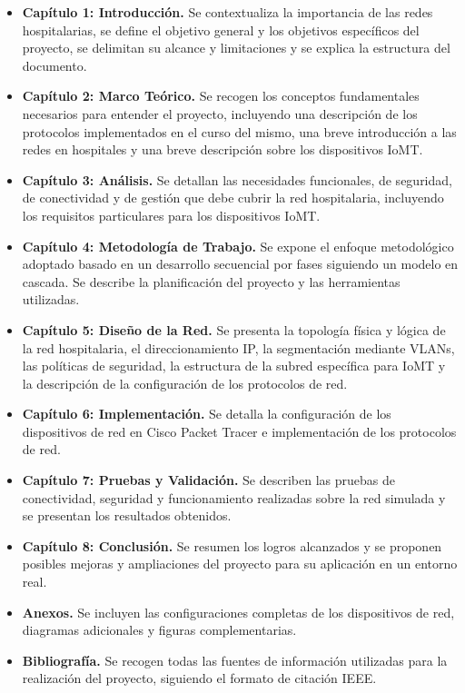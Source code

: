 \begin{itemize}
    \item \textbf{Capítulo 1: Introducción.} Se contextualiza la importancia de las redes hospitalarias, se define el objetivo general y los objetivos específicos del 
    proyecto, se delimitan su alcance y limitaciones y se explica la estructura del documento.
    \item \textbf{Capítulo 2: Marco Teórico.} Se recogen los conceptos fundamentales necesarios para entender el proyecto, incluyendo una descripción de los protocolos implementados 
    en el curso del mismo, una breve introducción a las redes en hospitales y una breve descripción sobre los dispositivos IoMT.
    \item \textbf{Capítulo 3: Análisis.} Se detallan las necesidades funcionales, de seguridad, de conectividad y de gestión que debe cubrir la red hospitalaria, 
    incluyendo los requisitos particulares para los dispositivos IoMT.
    \item \textbf{Capítulo 4: Metodología de Trabajo.} Se expone el enfoque metodológico adoptado basado en un desarrollo secuencial por fases siguiendo un modelo en cascada.  
    Se describe la planificación del proyecto y las herramientas utilizadas.
    \item \textbf{Capítulo 5: Diseño de la Red.} Se presenta la topología física y lógica de la red hospitalaria, el direccionamiento IP, la segmentación mediante VLANs, las 
    políticas de seguridad, la estructura de la subred específica para IoMT y la descripción de la configuración de los protocolos de red.
    \item \textbf{Capítulo 6: Implementación.} Se detalla la configuración de los dispositivos de red en Cisco Packet Tracer e implementación de los protocolos de red.
    \item \textbf{Capítulo 7: Pruebas y Validación.} Se describen las pruebas de conectividad, seguridad y funcionamiento realizadas sobre la red simulada y se presentan los 
    resultados obtenidos.
    \item \textbf{Capítulo 8: Conclusión.} Se resumen los logros alcanzados y se proponen posibles mejoras y ampliaciones del 
    proyecto para su aplicación en un entorno real.
    \item \textbf{Anexos.} Se incluyen las configuraciones completas de los dispositivos de red, diagramas adicionales y figuras complementarias.
    \item \textbf{Bibliografía.} Se recogen todas las fuentes de información utilizadas para la realización del proyecto, siguiendo el formato de citación \ac{IEEE}.
\end{itemize}
